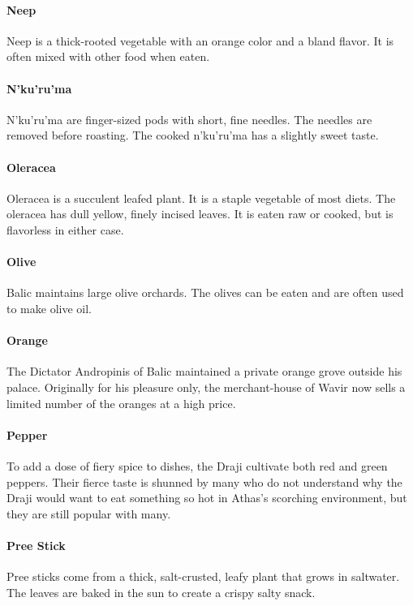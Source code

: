 \begin{multicols}{2}
\paragraph{Neep} Neep is a thick-rooted vegetable with an orange color and a bland flavor. It is often mixed with other food when eaten.\\
\paragraph{N'ku'ru'ma} N'ku'ru'ma are finger-sized pods with short, fine needles. The needles are removed before roasting. The cooked n'ku'ru'ma has a slightly sweet taste.\\
\paragraph{Oleracea} Oleracea is a succulent leafed plant. It is a staple vegetable of most diets. The oleracea has dull yellow, finely incised leaves. It is eaten raw or cooked, but is flavorless in either case.\\
\paragraph{Olive} Balic maintains large olive orchards. The olives can be eaten and are often used to make olive oil.\\
\paragraph{Orange} The Dictator Andropinis of Balic maintained a private orange grove outside his palace. Originally for his pleasure only, the merchant-house of Wavir now sells a limited number of the oranges at a high price.\\
\paragraph{Pepper} To add a dose of fiery spice to dishes, the Draji cultivate both red and green peppers. Their fierce taste is shunned by many who do not understand why the Draji would want to eat something so hot in Athas's scorching environment, but they are still popular with many.\\
\paragraph{Pree Stick} Pree sticks come from a thick, salt-crusted, leafy plant that grows in saltwater. The leaves are baked in the sun to create a crispy salty snack. \\

\end{multicols}
